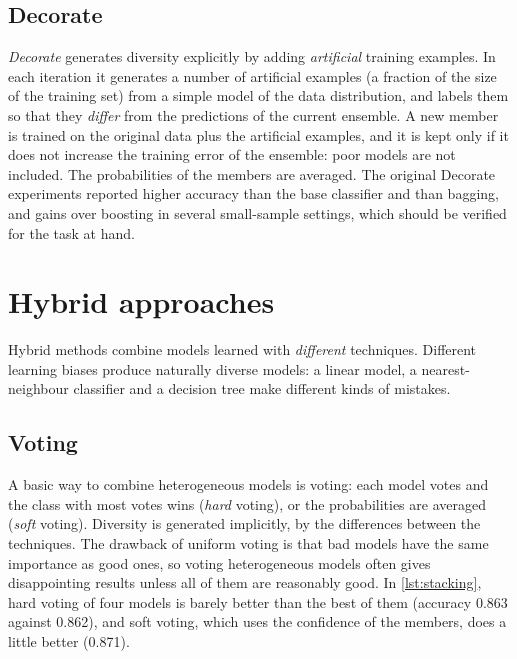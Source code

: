 \subsection{Decorate}

\emph{Decorate} \citep{melville2003constructing} generates diversity explicitly by adding
\emph{artificial} training examples. In each iteration it generates a number of artificial
examples (a fraction of the size of the training set) from a simple model of the data
distribution, and labels them so that they \emph{differ} from the predictions of the current
ensemble. A new member is trained on the original data plus the artificial examples, and it is
kept only if it does not increase the training error of the ensemble: poor models are not
included. The probabilities of the members are averaged. The original Decorate experiments reported higher accuracy than
the base classifier and than bagging, and gains over boosting in several small-sample settings, which should be
verified for the task at hand.

\section{Hybrid approaches}\label{sec:hybrid}

Hybrid methods combine models learned with \emph{different} techniques. Different learning
biases produce naturally diverse models: a linear model, a nearest-neighbour classifier and a
decision tree make different kinds of mistakes.

\subsection{Voting}

A basic way to combine heterogeneous models is voting: each model votes and the class
with most votes wins (\emph{hard} voting), or the probabilities are averaged (\emph{soft}
voting). Diversity is generated implicitly, by the differences between the techniques. The
drawback of uniform voting is that bad models have the same importance as good ones, so voting
heterogeneous models often gives disappointing results unless all of them are reasonably good.
In \cref{lst:stacking}, hard voting of four models is barely better than the best of them
(accuracy 0.863 against 0.862), and soft voting, which uses the confidence of the members, does
a little better (0.871).

